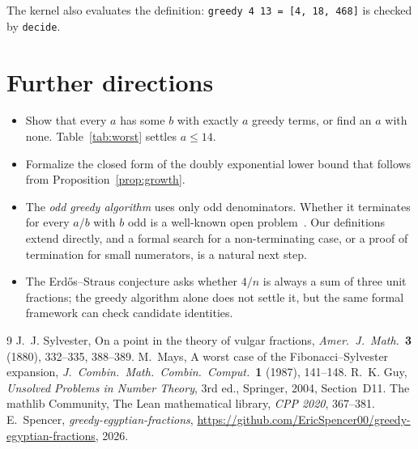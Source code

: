 \documentclass[11pt]{article}
\theoremstyle{definition}
\theoremstyle{remark}
\begin{document}
The kernel also evaluates the definition: \texttt{greedy 4 13 = [4, 18, 468]} is checked by
\texttt{decide}.

\section{Further directions}

\begin{itemize}
  \item Show that every $a$ has some $b$ with exactly $a$ greedy terms, or find an $a$ with none.
    Table~\ref{tab:worst} settles $a \le 14$.
  \item Formalize the closed form of the doubly exponential lower bound that follows from
    Proposition~\ref{prop:growth}.
  \item The \emph{odd greedy algorithm} uses only odd denominators. Whether it terminates for
    every $a/b$ with $b$ odd is a well-known open problem~\cite{guy}. Our definitions extend
    directly, and a formal search for a non-terminating case, or a proof of termination for
    small numerators, is a natural next step.
  \item The Erd\H{o}s--Straus conjecture asks whether $4/n$ is always a sum of three unit fractions;
    the greedy algorithm alone does not settle it, but the same formal framework can check
    candidate identities.
\end{itemize}

\begin{thebibliography}{9}
 J.~J. Sylvester, On a point in the theory of vulgar fractions,
  \emph{Amer.\ J.\ Math.}\ \textbf{3} (1880), 332--335, 388--389.
 M.~Mays, A worst case of the Fibonacci--Sylvester expansion,
  \emph{J.\ Combin.\ Math.\ Combin.\ Comput.}\ \textbf{1} (1987), 141--148.
 R.~K. Guy, \emph{Unsolved Problems in Number Theory}, 3rd ed., Springer, 2004,
  Section~D11.
 The mathlib Community, The Lean mathematical library,
  \emph{CPP 2020}, 367--381.
 E.~Spencer, \emph{greedy-egyptian-fractions},
  \url{https://github.com/EricSpencer00/greedy-egyptian-fractions}, 2026.
\end{thebibliography}
\end{document}
